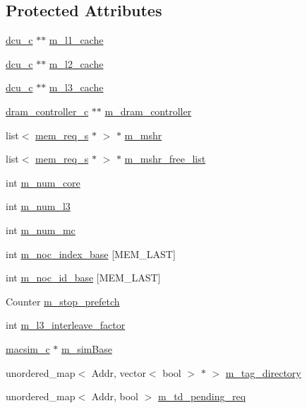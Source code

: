 \subsection*{Protected Attributes}
\begin{DoxyCompactItemize}
\item 
\hyperlink{classdcu__c}{dcu\_\-c} $\ast$$\ast$ \hyperlink{classmemory__c_a0bfafc54e9761b2ea991e668efb274c2}{m\_\-l1\_\-cache}
\item 
\hyperlink{classdcu__c}{dcu\_\-c} $\ast$$\ast$ \hyperlink{classmemory__c_a3d8dc521d1b278422bbc42a2a2ef446e}{m\_\-l2\_\-cache}
\item 
\hyperlink{classdcu__c}{dcu\_\-c} $\ast$$\ast$ \hyperlink{classmemory__c_a3ec227755e32dad0987dc9f6ec6681fd}{m\_\-l3\_\-cache}
\item 
\hyperlink{classdram__controller__c}{dram\_\-controller\_\-c} $\ast$$\ast$ \hyperlink{classmemory__c_a7372570a1fb983f16253261193a052bf}{m\_\-dram\_\-controller}
\item 
list$<$ \hyperlink{structmem__req__s}{mem\_\-req\_\-s} $\ast$ $>$ $\ast$ \hyperlink{classmemory__c_ab7b175ea316a51ff771ca652c2dae138}{m\_\-mshr}
\item 
list$<$ \hyperlink{structmem__req__s}{mem\_\-req\_\-s} $\ast$ $>$ $\ast$ \hyperlink{classmemory__c_a4268b16bf6a1f84172fc1a313a8f44c2}{m\_\-mshr\_\-free\_\-list}
\item 
int \hyperlink{classmemory__c_afaf8b643ce736f9ea9b2050b6740e710}{m\_\-num\_\-core}
\item 
int \hyperlink{classmemory__c_a3cf6fe78e2b25f56b3ff51b6f8b383d7}{m\_\-num\_\-l3}
\item 
int \hyperlink{classmemory__c_ade8ecba4b6abbf18ea424e530d0962e9}{m\_\-num\_\-mc}
\item 
int \hyperlink{classmemory__c_a1bf57a0de8f321201f37c448f7f730e7}{m\_\-noc\_\-index\_\-base} \mbox{[}MEM\_\-LAST\mbox{]}
\item 
int \hyperlink{classmemory__c_a7688509a181e0fd29dc6d70f59920f59}{m\_\-noc\_\-id\_\-base} \mbox{[}MEM\_\-LAST\mbox{]}
\item 
Counter \hyperlink{classmemory__c_ac90f740154b2099375a4464a264c3dc0}{m\_\-stop\_\-prefetch}
\item 
int \hyperlink{classmemory__c_abcf822c7e709f6013963173b5a8f6041}{m\_\-l3\_\-interleave\_\-factor}
\item 
\hyperlink{classmacsim__c}{macsim\_\-c} $\ast$ \hyperlink{classmemory__c_a8ba3319a3e385a0984dcb0ff7531a397}{m\_\-simBase}
\item 
unordered\_\-map$<$ Addr, vector$<$ bool $>$ $\ast$ $>$ \hyperlink{classmemory__c_ab6ce4ddeb85e8798bb9d844e6b2d6941}{m\_\-tag\_\-directory}
\item 
unordered\_\-map$<$ Addr, bool $>$ \hyperlink{classmemory__c_a4955ca08d109aa65c8532a1488dfffbb}{m\_\-td\_\-pending\_\-req}
\end{DoxyCompactItemize}


